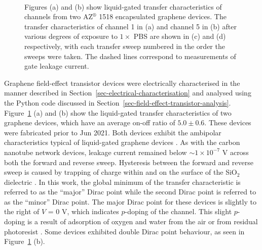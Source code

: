 \documentclass[
  a4paper,
]{scrbook}
\begin{document}
\begin{figure}
\begin{minipage}[t]{0.45\linewidth}
{{}

}

\end{minipage}%
%
\begin{minipage}[t]{0.01\linewidth}

{\centering 

~

}

\end{minipage}%

\caption[Liquid-gated transfer characteristics of channels from two
encapsulated graphene devices, alongside the change in transfer
characteristics upon various degrees of exposure to \(1 \times\)
PBS.]{\label{fig-pristine-graphene}Figures (a) and (b) show liquid-gated
transfer characteristics of channels from two AZ\(^\circledR\) 1518
encapsulated graphene devices. The transfer characteristics of channel 1
in (a) and channel 5 in (b) after various degrees of exposure to
\(1 \times\) PBS are shown in (c) and (d) respectively, with each
transfer sweep numbered in the order the sweeps were taken. The dashed
lines correspond to measurements of gate leakage current.}

\end{figure}

Graphene field-effect transistor devices were electrically characterised
in the manner described in Section~\ref{sec-electrical-characterisation}
and analysed using the Python code discussed in
Section~\ref{sec-field-effect-transistor-analysis}.
Figure~\ref{fig-pristine-graphene} (a) and (b) show the liquid-gated
transfer characteristics of two graphene devices, which have an average
on-off ratio of \(5.0 \pm 0.6\). These devices were fabricated prior to
Jun 2021. Both devices exhibit the ambipolar characteristics typical of
liquid-gated graphene devices
\autocite{Heller2009a,Heller2010,Xia2010,Kireev2017}. As with the carbon
nanotube network devices, leakage current remained below
\(\sim 1 \times 10^{-7}\) V across both the forward and reverse sweep.
Hysteresis between the forward and reverse sweep is caused by trapping
of charge within and on the surface of the SiO\(_{2}\) dielectric
\autocite{Bartolomeo2011}. In this work, the global minimum of the
transfer characteristic is referred to as the ``major'' Dirac point
while the second Dirac point is referred to as the ``minor'' Dirac
point. The major Dirac point for these devices is slightly to the right
of \(V\) = 0 V, which indicates \(p\)-doping of the channel. This slight
\(p\)-doping is a result of adsorption of oxygen and water from the air
or from residual photoresist \autocite{Cheng2011,Shin2012,Kireev2017}.
Some devices exhibited double Dirac point behaviour, as seen in
Figure~\ref{fig-pristine-graphene} (b).
\end{document}
